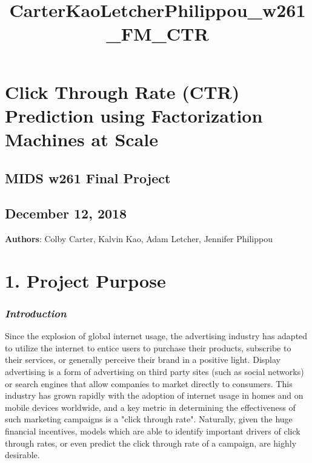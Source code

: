 \documentclass[11pt]{article}
\title{CarterKaoLetcherPhilippou\_w261\_FM\_CTR}
\begin{document}
    
    
    \maketitle
    
    

    
    \section{Click Through Rate (CTR) Prediction using Factorization
Machines at
Scale}\label{click-through-rate-ctr-prediction-using-factorization-machines-at-scale}

\subsection{MIDS w261 Final Project}\label{mids-w261-final-project}

\subsection{December 12, 2018}\label{december-12-2018}

\textbf{Authors}: Colby Carter, Kalvin Kao, Adam Letcher, Jennifer
Philippou

    

    \section{1. Project Purpose}\label{project-purpose}

\subsubsection{\texorpdfstring{\emph{Introduction}}{Introduction}}\label{introduction}

Since the explosion of global internet usage, the advertising industry
has adapted to utilize the internet to entice users to purchase their
products, subscribe to their services, or generally perceive their brand
in a positive light. Display advertising is a form of advertising on
third party sites (such as social networks) or search engines that allow
companies to market directly to consumers. This industry has grown
rapidly with the adoption of internet usage in homes and on mobile
devices worldwide, and a key metric in determining the effectiveness of
such marketing campaigns is a "click through rate". Naturally, given the
huge financial incentives, models which are able to identify important
drivers of click through rates, or even predict the click through rate
of a campaign, are highly desirable.
\end{document}
